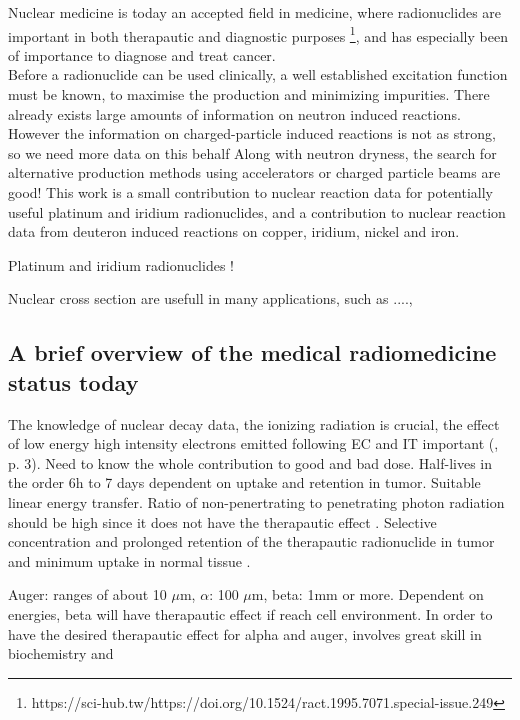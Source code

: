 

Nuclear medicine is today an accepted field in medicine, where radionuclides are important in both therapautic and diagnostic purposes \footnote{https://sci-hub.tw/https://doi.org/10.1524/ract.1995.7071.special-issue.249}, and has especially  been of importance to diagnose and treat cancer. \\ 

Before a radionuclide can be used clinically, a well established excitation function must be known, to maximise the production and minimizing impurities. There already exists large amounts of information on neutron induced reactions. However the information on charged-particle induced reactions is not as strong, so we need more data on this behalf  Along with neutron dryness, the search for alternative production methods using accelerators or charged particle beams are good!  
This work is a small contribution to nuclear reaction data for potentially useful platinum and iridium radionuclides, and a contribution to nuclear reaction data from deuteron induced reactions on copper, iridium, nickel and iron. 

Platinum and iridium radionuclides ! 

Nuclear cross section are usefull in many applications, such as ...., 


\subsection{A brief overview of the medical radiomedicine status today }

The knowledge of nuclear decay data, the ionizing radiation is crucial, the effect of low energy high intensity electrons emitted following EC and IT important (\cite{international2012iaea}, p. 3). Need to know the whole contribution to good and bad dose. Half-lives in the order 6h to 7 days dependent on uptake and retention in tumor. Suitable linear energy transfer. Ratio of non-penertrating to penetrating photon radiation should be high since it does not have the therapautic effect \cite{international2012iaea, p. 1}. Selective concentration and prolonged retention of the therapautic radionuclide in tumor and minimum uptake in normal tissue \cite{international2012iaea, p. 2}. 

Auger: ranges of about 10 $\mu$m, $\alpha$: 100 $\mu$m, beta: 1mm or more. Dependent on energies, beta will have therapautic effect if reach cell environment. In order to have the desired therapautic effect for alpha and auger, involves great skill in biochemistry and 

